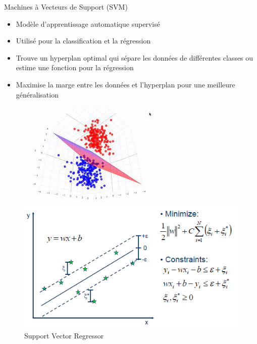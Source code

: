 \documentclass{beamer}
\begin{document}
\begin{frame}{Machines à Vecteurs de Support (SVM)}
	\begin{itemize}
		\item Modèle d'apprentissage automatique supervisé
		\item Utilisé pour la classification et la régression
		\item Trouve un hyperplan optimal qui sépare les données de différentes classes ou estime une fonction pour la régression
		\item Maximise la marge entre les données et l'hyperplan pour une meilleure généralisation
	\end{itemize}
	
	  \begin{figure}
	  	 \begin{minipage}[t]{0.45\linewidth}
		\includegraphics[width=\linewidth]{csvm.jpeg}
		\caption{Support Vector Classifier}
	\end{minipage}
	\hfill
	\begin{minipage}[t]{0.45\linewidth}
		\centering
		\includegraphics[width=\linewidth]{SVR_2.png}
		\caption{Support Vector Regressor}
	\end{minipage}
	  \end{figure}
\end{frame}
\end{document}
